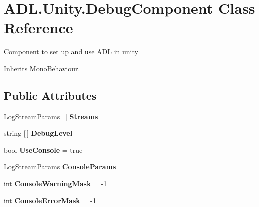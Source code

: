 \hypertarget{class_a_d_l_1_1_unity_1_1_debug_component}{}\section{A\+D\+L.\+Unity.\+Debug\+Component Class Reference}
\label{class_a_d_l_1_1_unity_1_1_debug_component}


Component to set up and use \mbox{\hyperlink{namespace_a_d_l}{A\+DL}} in unity  




Inherits Mono\+Behaviour.

\subsection*{Public Attributes}
\begin{DoxyCompactItemize}
\item 
\mbox{\label{class_a_d_l_1_1_unity_1_1_debug_component_a2aa57f89e78ecf57df57b7a0819b8a03}} 
\mbox{\hyperlink{class_a_d_l_1_1_unity_1_1_log_stream_params}{Log\+Stream\+Params}} \mbox{[}$\,$\mbox{]} {\bfseries Streams}
\item 
\mbox{\label{class_a_d_l_1_1_unity_1_1_debug_component_a291ba4f39b3eeb64032fffaf0273bcd4}} 
string \mbox{[}$\,$\mbox{]} {\bfseries Debug\+Level}
\item 
\mbox{\label{class_a_d_l_1_1_unity_1_1_debug_component_a265f04906b1dea90b4fd596c54487cd6}} 
bool {\bfseries Use\+Console} = true
\item 
\mbox{\label{class_a_d_l_1_1_unity_1_1_debug_component_ab71e17ba3b7484cdff81a134138f6a3a}} 
\mbox{\hyperlink{class_a_d_l_1_1_unity_1_1_log_stream_params}{Log\+Stream\+Params}} {\bfseries Console\+Params}
\item 
\mbox{\label{class_a_d_l_1_1_unity_1_1_debug_component_a54d243584c6cf8386fcdd889087ffd84}} 
int {\bfseries Console\+Warning\+Mask} = -\/1
\item 
\mbox{\label{class_a_d_l_1_1_unity_1_1_debug_component_a32a3c2d7d092ce8fa1834a0f29efd2b5}} 
int {\bfseries Console\+Error\+Mask} = -\/1
\end{DoxyCompactItemize}
